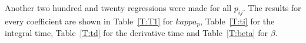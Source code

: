 Another two hundred and twenty regressions were made for all $p_{ij}$. The results for every coefficient are shown in Table~\ref{T:T1} for $kappa_p$, Table~\ref{T:ti} for the integral time, Table~\ref{T:td} for the derivative time and Table~\ref{T:beta} for $\beta$.

